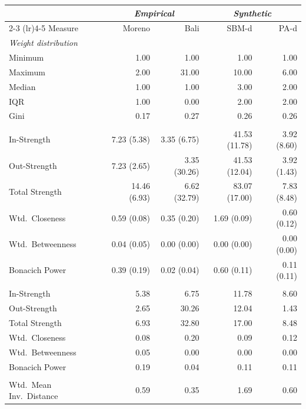 \documentclass[11pt]{article}
\begin{document}
\begin{table}[!htbp]
\centering
\footnotesize
\setlength{\tabcolsep}{4pt}
\begin{tabular}{l r r | r r}
\toprule
& \multicolumn{2}{c|}{\textit{Empirical}} & \multicolumn{2}{c}{\textit{Synthetic}} \\
\cmidrule(lr){2-3} \cmidrule(lr){4-5}
Measure & Moreno & Bali & SBM-d & PA-d \\
\midrule
\multicolumn{5}{l}{\textit{Weight distribution}} \\
Minimum & 1.00 & 1.00  & 1.00  & 1.00 \\
Maximum & 2.00 & 31.00 & 10.00 & 6.00 \\
Median  & 1.00 & 1.00  & 3.00  & 2.00 \\
IQR     & 1.00 & 0.00  & 2.00  & 2.00 \\
Gini    & 0.17 & 0.27  & 0.26  & 0.26 \\
\addlinespace
\multicolumn{5}{l}{\textit{Centrality}, mean (SD)} \\
In-Strength       & 7.23 (5.38)  & 3.35 (6.75)  & 41.53 (11.78) & 3.92 (8.60) \\
Out-Strength      & 7.23 (2.65)  & 3.35 (30.26) & 41.53 (12.04) & 3.92 (1.43) \\
Total Strength    & 14.46 (6.93) & 6.62 (32.79) & 83.07 (17.00) & 7.83 (8.48) \\
Wtd.\ Closeness   & 0.59 (0.08)  & 0.35 (0.20)  & 1.69 (0.09)   & 0.60 (0.12) \\
Wtd.\ Betweenness & 0.04 (0.05)  & 0.00 (0.00)  & 0.00 (0.00)   & 0.00 (0.00) \\
Bonacich Power    & 0.39 (0.19)  & 0.02 (0.04)  & 0.60 (0.11)   & 0.11 (0.11) \\
\addlinespace
\multicolumn{5}{l}{\textit{Centralization} (SD of node scores)} \\
In-Strength       & 5.38 & 6.75  & 11.78 & 8.60 \\
Out-Strength      & 2.65 & 30.26 & 12.04 & 1.43 \\
Total Strength    & 6.93 & 32.80 & 17.00 & 8.48 \\
Wtd.\ Closeness   & 0.08 & 0.20  & 0.09  & 0.12 \\
Wtd.\ Betweenness & 0.05 & 0.00  & 0.00  & 0.00 \\
Bonacich Power    & 0.19 & 0.04  & 0.11  & 0.11 \\
\addlinespace
\multicolumn{5}{l}{\textit{Topology}} \\
Wtd.\ Mean Inv.\ Distance & 0.59 & 0.35 & 1.69 & 0.60 \\

\end{tabular}
\end{table}
\end{document}
